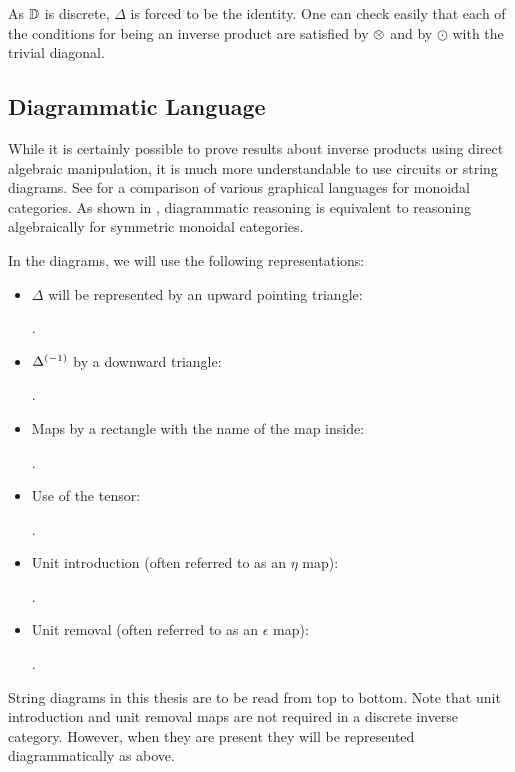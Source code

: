 As $\mathbb{D}$ is discrete, $\Delta$ is forced to be the identity. One can check easily that each of the
conditions for being an inverse product are satisfied by $\otimes$ and by $\odot$ with the trivial diagonal.

\subsection{Diagrammatic Language} %
\label{sub:diagrammatic_language}

While it is certainly possible to prove results about inverse products using direct algebraic
manipulation, it is much more understandable to use circuits or string diagrams. See
\cite{selinger11:graphical} for a comparison of various graphical languages for monoidal categories.
As shown in
\cite{street-ross-1991-GTC-I}, diagrammatic reasoning is equivalent to reasoning algebraically for
symmetric monoidal categories.

In the diagrams, we will use the following representations:
\begin{itemize}
  \item $\Delta$ will be represented by an upward pointing triangle: .
  \item ${\Delta}^{(-1)}$ by a downward triangle: .
  \item Maps by a rectangle with the name of the map inside: .
  \item Use of the tensor: .
  \item Unit introduction (often referred to as an $\eta$ map): .
  \item Unit removal (often referred to as an $\epsilon$ map): .
\end{itemize}
String diagrams in this thesis are to be read from top to bottom. Note that unit introduction and
unit removal maps are not required in a discrete inverse category. However, when they are present
they will be represented diagrammatically as above.


